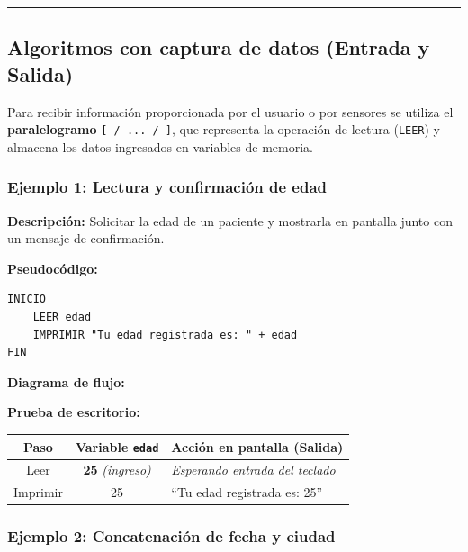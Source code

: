 \begin{center}\rule{0.5\linewidth}{0.5pt}\end{center}

\subsection{Algoritmos con captura de datos (Entrada y
Salida)}\label{algoritmos-con-captura-de-datos-entrada-y-salida}

Para recibir información proporcionada por el usuario o por sensores se
utiliza el \textbf{paralelogramo} \texttt{{[}\ /\ ...\ /\ {]}}, que
representa la operación de lectura (\texttt{LEER}) y almacena los datos
ingresados en variables de memoria.

\subsubsection{Ejemplo 1: Lectura y confirmación de
edad}\label{ejemplo-1-lectura-y-confirmaciuxf3n-de-edad}

\textbf{Descripción:} Solicitar la edad de un paciente y mostrarla en
pantalla junto con un mensaje de confirmación.

\textbf{Pseudocódigo:}

\begin{verbatim}
INICIO
    LEER edad
    IMPRIMIR "Tu edad registrada es: " + edad
FIN
\end{verbatim}

\textbf{Diagrama de flujo:}



\textbf{Prueba de escritorio:}

{\def\LTcaptype{none} %
\begin{longtable}[]{@{}ccl@{}}
\toprule\noalign{}
Paso & Variable \texttt{edad} & Acción en pantalla (Salida) \\
\midrule\noalign{}
\endhead
\bottomrule\noalign{}
\endlastfoot
Leer & \textbf{25} \emph{(ingreso)} & \emph{Esperando entrada del
teclado} \\
Imprimir & 25 & ``Tu edad registrada es: 25'' \\
\end{longtable}
}

\subsubsection{Ejemplo 2: Concatenación de fecha y
ciudad}\label{ejemplo-2-concatenaciuxf3n-de-fecha-y-ciudad}

